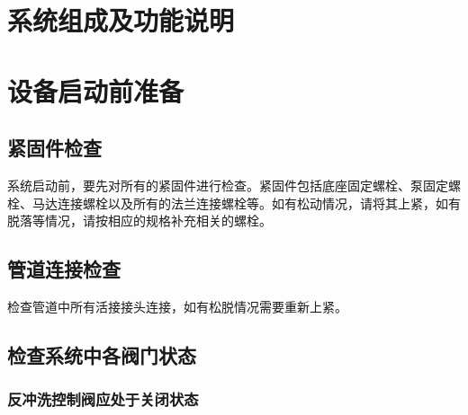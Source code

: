 \documentclass[UTF8,a4paper,12pt,titlepage]{ctexart}
\begin{document}


\tableofcontents %

\newpage %


\section{系统组成及功能说明}


\section{设备启动前准备}\label{sec:sg1}
    \subsection{紧固件检查}
    系统启动前，要先对所有的紧固件进行检查。紧固件包括底座固定螺栓、泵固定螺栓、马达连接螺栓以及所有的法兰连接螺栓等。如有松动情况，请将其上紧，如有脱落等情况，请按相应的规格补充相关的螺栓。

    \subsection{管道连接检查}
    检查管道中所有活接接头连接，如有松脱情况需要重新上紧。

    \subsection{检查系统中各阀门状态}
        

        \subsubsection{反冲洗控制阀应处于关闭状态}\label{sec:sg1-1}
        
        
\end{document}

